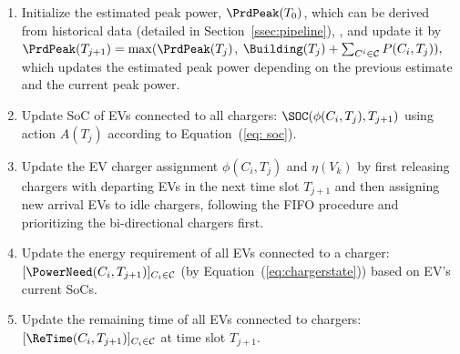 \begin{enumerate}[leftmargin=*]
    \item Initialize the estimated peak power, $\PrdPeak(T_0)$, which can be derived from historical data  (detailed in Section~\ref{ssec:pipeline}),
    , and update it by
    $
    \PrdPeak(T_{j+1}) = \max(\PrdPeak(T_j)$, $ \Building(T_j) + \sum_{C^i \in \mathcal{C}} P(C_i, T_j)),
    $
    which updates the estimated peak power depending on the previous estimate and the current peak power.
    \item Update SoC of EVs connected to all chargers: $\SOC(\phi(C_i,T_j), T_{j+1})$ using action $A(T_j)$ according to Equation~(\ref{eq: soc}). 
   \item Update the EV charger assignment $\phi(C_i, T_j)$ and $\eta(V_k)$ by first releasing chargers with departing EVs in the next time slot $T_{j+1}$ and then assigning new arrival EVs to idle chargers, following the FIFO procedure and prioritizing the bi-directional chargers first. 
   \item Update the energy requirement of all EVs connected to a charger: $[\PowerNeed(C_i, T_{j+1})]_{C_i \in \mathcal{C}}$ (by Equation~(\ref{eq:chargerstate})) based on EV's current SoCs.
   \item Update the remaining time of all EVs connected to chargers: $[\ReTime(C_i, T_{j+1})]_{C_i \in \mathcal{C}}$ at time slot $T_{j+1}$.   
\end{enumerate}


